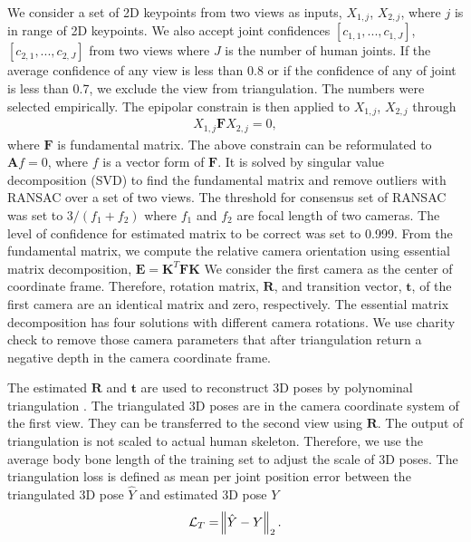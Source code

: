 \documentclass[10pt,twocolumn,letterpaper]{article}
\begin{document}
We consider a set of 2D keypoints from two views as inputs, $X_{1,j}$, $X_{2,j}$, where $j$ is in range of 2D keypoints. We also accept joint confidences $[c_{1,1},...,c_{1,J}]$, $[c_{2,1},...,c_{2,J}]$ from two views where $J$ is the number of human joints. If the average confidence of any view is less than 0.8 or if the confidence of any of joint is less than 0.7, we exclude the view from triangulation. The numbers were selected empirically. The epipolar constrain is then applied to $X_{1,j}$, $X_{2,j}$ through
\begin{align}
X_{1,j} \mathbf {F} X_{2,j} = 0, 
\label{equ:wasserstein_loss}
\end{align}
where $\mathbf{F}$ is fundamental matrix. The above constrain can be reformulated to $\mathbf{A}f=0$, where $f$ is a vector form of $\mathbf{F}$. It is solved by singular value decomposition (SVD) to find the fundamental matrix and remove outliers with RANSAC over a set of two views. The threshold for consensus set of RANSAC was set to $3/(f_1+f_2)$ where $f_1$ and $f_2$ are focal length of two cameras. The level of confidence for estimated matrix to be correct was set to 0.999. From the fundamental matrix, we compute the relative camera orientation using essential matrix decomposition, $\mathbf{E}=\mathbf{K}^T \mathbf{F} \mathbf{K}$ 
We consider the first camera as the center of coordinate frame. Therefore, rotation matrix, $\mathbf{R}$, and transition vector, $\mathbf{t}$, of the first camera are an identical matrix and zero, respectively. The essential matrix decomposition has four solutions with different camera rotations. We use charity check to remove those camera parameters that after triangulation return a negative depth in the camera coordinate frame. 


The estimated $\mathbf{R}$ and $\mathbf{t}$ are used to reconstruct 3D poses by polynominal triangulation \cite{hartley_triangulation_1997}. The triangulated 3D poses are in the camera coordinate system of the first view. They can be transferred to the second view using $\mathbf{R}$. The output of triangulation is not scaled to actual human skeleton. Therefore, we use the average body bone length of the training set to adjust the scale of 3D poses. The triangulation loss is defined as mean per joint position error between the triangulated 3D pose $\hat{Y}$ and estimated 3D pose $Y$ 
\begin{align}
\mathcal{L}_{T} = \norm{\hat{Y}-Y}_2. \label{equ:wasserstein_loss}
\end{align}
\end{document}
